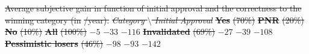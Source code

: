 \documentclass[12pt]{article} %
\providecommand{\DIFdeltex}[1]{{\protect\color{red}\sout{#1}}}                      %
\providecommand{\DIFdelbegin}{} %
\providecommand{\DIFdelend}{} %
\providecommand{\DIFdelFL}[1]{\DIFdel{#1}} %
\providecommand{\DIFdel}[1]{\texorpdfstring{\DIFdeltex{#1}}{}} %
\newcommand{\DIFscaledelfig}{0.5}
\newlength{\DIFdelgraphicswidth} %
\newlength{\DIFdelgraphicsheight} %
\newcommand{\DIFdelincludegraphics}[2][]{%
\sbox{\DIFdelgraphicsbox}{\DIFOincludegraphics[#1]{#2}}%
\settoboxwidth{\DIFdelgraphicswidth}{\DIFdelgraphicsbox} %
\settoboxtotalheight{\DIFdelgraphicsheight}{\DIFdelgraphicsbox} %
\scalebox{\DIFscaledelfig}{%
\parbox[b]{\DIFdelgraphicswidth}{\usebox{\DIFdelgraphicsbox}\\[-\baselineskip] \rule{\DIFdelgraphicswidth}{0em}}\llap{\resizebox{\DIFdelgraphicswidth}{\DIFdelgraphicsheight}{%
\setlength{\unitlength}{\DIFdelgraphicswidth}%
\begin{picture}(1,1)%
\thicklines\linethickness{2pt} %
{\color[rgb]{1,0,0}\put(0,0){\framebox(1,1){}}}%
{\color[rgb]{1,0,0}\put(0,0){\line( 1,1){1}}}%
{\color[rgb]{1,0,0}\put(0,1){\line(1,-1){1}}}%
\end{picture}%
}\hspace*{3pt}}} %
} %
\DeclareRobustCommand{\DIFdelbegin}{\DIFOdelbegin \let\includegraphics\DIFdelincludegraphics} %
\DeclareRobustCommand{\DIFdelend}{\DIFOaddend \let\includegraphics\DIFOincludegraphics} %
\begin{document}
\begin{appendices}
\DIFdelbegin %
{%
\DIFdelFL{Average subjective gain in function of initial approval and the correctness to the winning category (in }%
\DIFdelFL{/year).}}
\textit{\DIFdelFL{Category $\setminus$ Initial Approval}} %
\textbf{\DIFdelFL{Yes}} %
\DIFdelFL{(70\%) }%
\textbf{\DIFdelFL{PNR}} %
\DIFdelFL{(20\%) }%
\textbf{\DIFdelFL{No}} %
\DIFdelFL{(10\%) }%
\textbf{\DIFdelFL{All}} %
\DIFdelFL{(100\%) }%
\DIFdelFL{$-5$ }%
\DIFdelFL{$-33$ }%
\DIFdelFL{$-116$ }%
\textbf{\DIFdelFL{Invalidated}} %
\DIFdelFL{(69\%) }%
\DIFdelFL{$-27$ }%
\DIFdelFL{$-39$ }%
\DIFdelFL{$-108$ }%
\textbf{\DIFdelFL{Pessimistic losers}} %
\DIFdelFL{(46\%) }%
\DIFdelFL{$-98$ }%
\DIFdelFL{$-93$ }%
\DIFdelFL{$-142$ }%
\DIFdelend %




\end{appendices}
\end{document}
